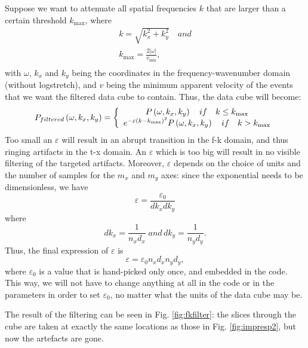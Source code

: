 Suppose we want to attenuate all spatial frequencies $k$ that are larger than a certain threshold $ k_{\max }$, where
\begin{equation}
\label{eqn:kdef}
\begin{array}{l}
 k = \sqrt {k_x^2  + k_y^2 } \quad and \\ 
 k_{\max }  = \frac{{2\left| \omega  \right|}}{{v_{\min } }}, \\ 
 \end{array}
\end{equation}
with $\omega$, $k_x$ and $k_y$ being the coordinates in the frequency-wavenumber domain (without logstretch), and $v$ being the minimum apparent velocity of the events that we want the filtered data cube to contain. Thus, the data cube will become:
\begin{equation}
\label{eqn:fkfilt}
P_{filtered} \left( {\omega ,k_x ,k_y } \right) = \left\{ {\begin{array}{*{20}c}
   {P\left( {\omega ,k_x ,k_y } \right)\quad if\quad k \le k_{\max } }  \\
   {e^{ - \varepsilon \left( {k - k_{\max } } \right)^2 } P\left( {\omega ,k_x ,k_y } \right)\quad if\quad k > k_{\max } }  \\
\end{array}} \right.
\end{equation}
Too small an $\varepsilon$ will result in an abrupt transition in the f-k domain, and thus ringing artifacts in the t-x domain. An $\varepsilon$ which is too big will result in no visible filtering of the targeted artifacts. Moreover, $\varepsilon$ depends on the choice of units and the number of samples for the $m_x$ and $m_y$ axes: since the exponential needs to be dimensionless, we have
\[
\varepsilon  = \frac{{\varepsilon _0 }}{{dk_x dk_y }}
\]
where
\[
dk_x  = \frac{1}{{n_x d_x }}\;and\,dk_y  = \frac{1}{{n_y d_y }}.
\]
Thus, the final expression of $\varepsilon$ is 
\begin{equation}
\label{eqn:epsi}
\varepsilon  = \varepsilon _0 n_x d_x n_y d_y ,
\end{equation}
where $\varepsilon _0$ is a value that is hand-picked only once, and embedded in the code. This way, we will not have to change anything at all in the code or in the parameters in order to set $\varepsilon _0$, no matter what the units of the data cube may be. 

The result of the filtering can be seen in Fig. \ref{fig:fkfilter}: 
the slices through the cube are taken at exactly the same locations as
those in Fig. \ref{fig:impresp2}, but now the artefacts are gone. 
